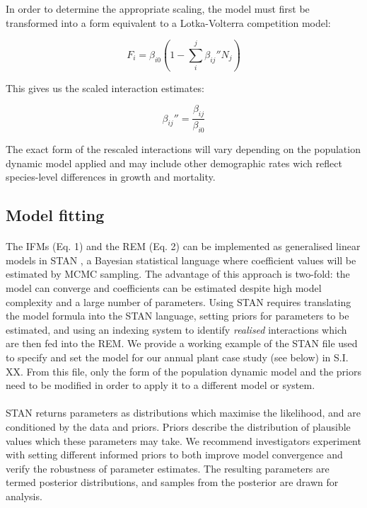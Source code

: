 \documentclass[a4,12pt]{article}
\begin{document}
        In order to determine the appropriate scaling, the model must first be transformed into a form equivalent to a Lotka-Volterra competition model: 

        \begin{equation}
        F_{i} = \beta_{i0} \left ( 1 - \sum_{i}^{j} {\beta_{ij}}'' N_{j} \right )
        \label{LVform}
        \end{equation}

        This gives us the scaled interaction estimates: 
 
        \begin{equation}
        {\beta_{ij}}'' = \frac{\beta_{ij}}{\beta_{i0}}
        \label{scaling}
        \end{equation}

        The exact form of the rescaled interactions will vary depending on the population dynamic model applied and may include other demographic rates wich reflect species-level differences in growth and mortality.
        
    \subsection{Model fitting}

        \paragraph{}        
        The IFMs (Eq. 1) and the REM (Eq. 2) can be implemented as generalised linear models in STAN \citep{Carpenter2017}, a Bayesian statistical language where coefficient values will be estimated by MCMC sampling. The advantage of this approach is two-fold: the model can converge and coefficients can be estimated despite high model complexity and a large number of parameters. Using STAN requires translating the model formula into the STAN language, setting priors for parameters to be estimated, and using an indexing system to identify \textit{realised} interactions which are then fed into the REM. We provide a working example of the STAN file used to specify and set the model for our annual plant case study (see below) in S.I. XX. From this file, only the form of the population dynamic model and the priors need to be modified in order to apply it to a different model or system. 

        \paragraph{}
        STAN returns parameters as distributions which maximise the likelihood, and are conditioned by the data and priors. Priors describe the distribution of plausible values which these parameters may take. We recommend investigators experiment with setting different informed priors to both improve model convergence and verify the robustness of parameter estimates. The resulting parameters are termed posterior distributions, and samples from the posterior are drawn for analysis. 
\end{document}
